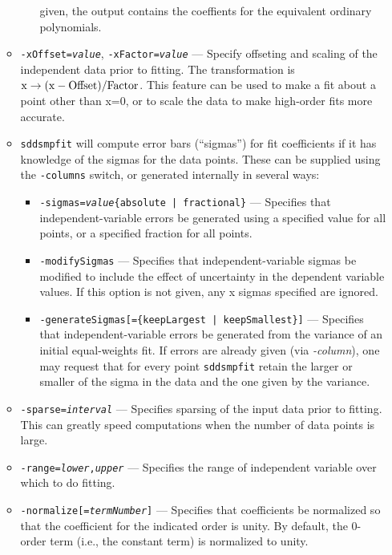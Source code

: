 \begin{itemize}
\begin{itemize}
\begin{itemize}
        given, the output contains the coeffients for the equivalent ordinary polynomials.
        \end{itemize}
    \item {\tt -xOffset={\em value}}, {\tt -xFactor={\em value}} --- Specify offseting and scaling of the independent
        data prior to fitting.  The transformation is ${\rm x \rightarrow (x - Offset)/Factor}$.  This feature can
        be used to make a fit about a point other than x=0, or to scale the data to make high-order fits more
        accurate.
    \item {\tt sddsmpfit} will compute error bars (``sigmas'') for fit coefficients if it has knowledge of 
        the sigmas for the data points.  These can be supplied using the {\tt -columns} switch, or generated
        internally in several ways:
        \begin{itemize}
        \item {\tt -sigmas={\em value}\{absolute | fractional\}} --- Specifies that independent-variable
        errors be generated using a specified value for all points, or a specified fraction for all points.
        \item {\tt -modifySigmas} --- Specifies that independent-variable sigmas be modified to include the effect
        of uncertainty in the dependent variable values.  If this option is not given, any x sigmas specified
        are ignored.
        \item {\tt -generateSigmas[=\{keepLargest | keepSmallest\}]} --- Specifies that independent-variable errors
        be generated from the variance of an initial equal-weights fit. If errors are already given (via {\em -column}),
        one may request that for every point {\tt sddsmpfit} retain the larger or smaller of the sigma in the data
        and the one given by the variance.
        \end{itemize}
    \item {\tt -sparse={\em interval}} --- Specifies sparsing of the input data prior to fitting.  This can greatly
        speed computations when the number of data points is large.
    \item {\tt -range={\em lower},{\em upper}} --- Specifies the range of independent variable over which to do fitting.
    \item {\tt -normalize[={\em termNumber}]} --- Specifies that coefficients be normalized so that the coefficient
        for the indicated order is unity.  By default, the 0-order term (i.e., the constant term) is normalized to unity.

\end{itemize}
\end{itemize}
